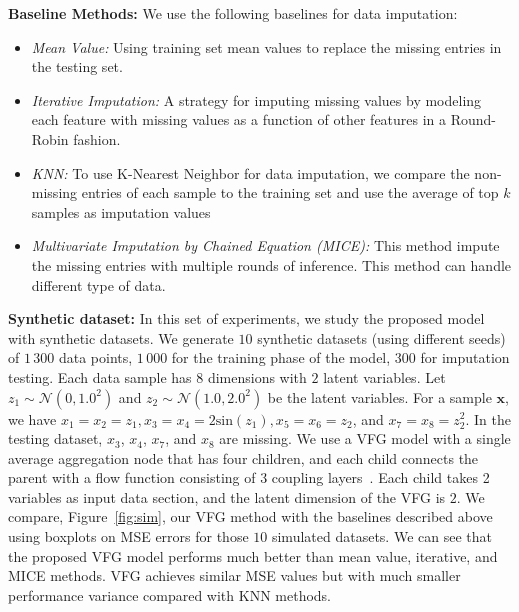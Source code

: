 \documentclass{article}
\begin{document}
\textbf{Baseline Methods:} We use the following baselines for data imputation:%
\begin{itemize}
\item \textit{Mean Value:} Using training set mean values to replace the missing entries in the testing set.   
\item \textit{Iterative Imputation:} A strategy for imputing missing values by modeling each feature with missing values as a function of other features in a Round-Robin fashion.   
\item \textit{KNN:} To use K-Nearest Neighbor for data imputation,  we compare the non-missing entries of each sample to the training set and use the  average of top $k$ samples as imputation values   
\item \textit{Multivariate Imputation by Chained Equation (MICE):} This method impute the missing entries with multiple  rounds of inference. This method can handle different type of data.
\end{itemize}  

\textbf{Synthetic dataset: } In this set of experiments, we study the proposed model with synthetic datasets.
We generate $10$ synthetic datasets (using different seeds) of $1\,300$ data points, $1\,000$ for the training phase of the model, $300$ for imputation testing. 
Each data sample  has $8$ dimensions with $2$ latent variables. 
Let $z_1 \sim \mathcal{N}(0,1.0^2)$ and $z_2 \sim  \mathcal{N}(1.0,2.0^2)$ be the latent variables. For a sample $\mathbf{x}$, we have  $x_1=x_2 = z_1, x_3=x_4= 2\textrm{sin}(z_1), x_5=x_6 =z_2$, and $x_7= x_8 = z_2^2$.  In the testing dataset, $x_3$, $x_4$, $x_7$, and $x_8$ are missing. We use a VFG model with a single average aggregation node that has four children, and each child connects the parent with a flow function consisting of 3 coupling layers~\cite{Dinh2016DensityEU}. 
Each child takes 2 variables as input data section, and the latent dimension of the VFG is $2$.
We compare, Figure~\ref{fig:sim}, our VFG method with the baselines described above using boxplots on MSE errors for those $10$ simulated datasets.
We can see that the proposed VFG model performs much better than mean value, iterative, and MICE methods. 
VFG achieves similar MSE values but with much smaller performance variance compared with KNN methods.  
\end{document}
